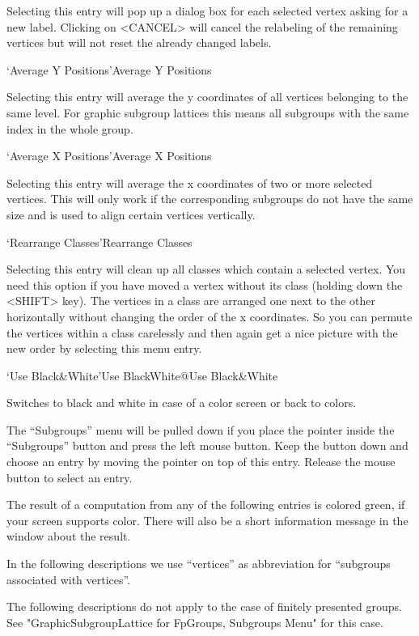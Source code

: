 Selecting  this entry will pop  up a dialog  box for each selected vertex
asking for a new label.  Clicking on <CANCEL>  will cancel the relabeling
of the remaining vertices but will not reset the already changed labels.

\>`Average Y Positions'{Average Y Positions}

Selecting this entry will average the y coordinates of all vertices
belonging to the same level. For graphic subgroup lattices this means all
subgroups with the same index in the whole group.

\>`Average X Positions'{Average X Positions}

Selecting this entry  will  average the x   coordinates  of two or   more
selected vertices.  This will only work if the corresponding subgroups do
not have the same size and is used to align certain vertices
vertically.

\>`Rearrange Classes'{Rearrange Classes}

Selecting this entry will clean up all classes which contain a selected
vertex. You need this option if you have moved a vertex without its class
(holding down the <SHIFT> key). The vertices in a class are arranged one
next to the other horizontally without changing the order of the x
coordinates. So you can permute the vertices within a class carelessly and
then again get a nice picture with the new order by selecting this menu
entry.

\>`Use Black\&White'{Use BlackWhite}@{Use Black\&White}

Switches to black and white in case of a color screen or back to colors.



The ``Subgroups'' menu will be pulled down  if you place the pointer inside
the ``Subgroups'' button and press the left mouse  button.  Keep the button
down and choose an entry   by moving the pointer  on  top of this  entry.
Release the mouse button to select an entry.

The result   of a computation from   any of the  following  entries is
colored green, if your screen supports color.  There will also be a short
information message in the {\GAP} window about the result.

In the following descriptions   we use ``vertices'' as abbreviation  for
``subgroups associated with vertices''.

The following descriptions do not apply to the case of finitely presented
groups. See "GraphicSubgroupLattice for FpGroups, Subgroups Menu" for this
case. 

